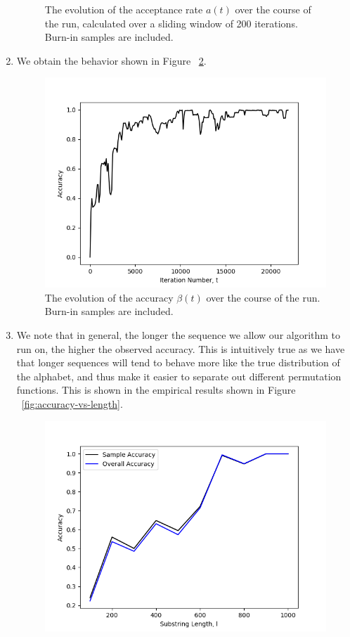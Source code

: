 \documentclass[secnumaric,notitlepage,amsmath,amssymb,nofootinbib,floatfix,12pt]{revtex4-1}
\begin{document}
\begin{enumerate}[label=(\alph*)]
\begin{figure}
\caption{The evolution of the acceptance rate $a(t)$ over the course of the run, calculated over a sliding window of 200 iterations. Burn-in samples are included.}
\label{fig:acceptance-rates}
\end{figure}
\item We obtain the behavior shown in Figure ~\ref{fig:accuracies}.
\begin{figure}[htb]
\includegraphics[scale=0.7]{../plots/accuracy_vs_iteration.png}
\caption{The evolution of the accuracy $\beta(t)$ over the course of the run. Burn-in samples are included.}
\label{fig:accuracies}
\end{figure}
\item We note that in general, the longer the sequence we allow our algorithm to run on, the higher the observed accuracy. This is intuitively true as we have that longer sequences will tend to behave more like the true distribution of the alphabet, and thus make it easier to separate out different permutation functions. This is shown in the empirical results shown in Figure ~\ref{fig:accuracy-vs-length}.
\begin{figure}[htb]
\includegraphics[scale=0.6]{../plots/accuracy_vs_length.png}

\end{figure}
\end{enumerate}
\end{document}
